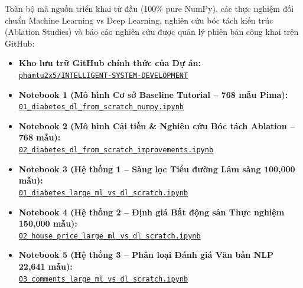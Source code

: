 \documentclass[12pt,a4paper]{report}
\begin{document}
\begin{tcolorbox}[colback=blue!3!white, colframe=blue!75!black, title=\textbf{Kho Lưu Trữ Mã Nguồn \& Hệ Thống Jupyter Notebooks Thực Nghiệm Dự Án (GitHub)}]
\small
Toàn bộ mã nguồn triển khai từ đầu (100\% pure NumPy), các thực nghiệm đối chuẩn Machine Learning vs Deep Learning, nghiên cứu bóc tách kiến trúc (Ablation Studies) và báo cáo nghiên cứu được quản lý phiên bản công khai trên GitHub:
\begin{itemize}[leftmargin=1.5em, itemsep=3pt]
    \item \textbf{Kho lưu trữ GitHub chính thức của Dự án:}\\ \href{https://github.com/phamtu2x5/INTELLIGENT-SYSTEM-DEVELOPMENT}{\texttt{phamtu2x5/INTELLIGENT-SYSTEM-DEVELOPMENT}}
    \item \textbf{Notebook 1 (Mô hình Cơ sở Baseline Tutorial -- 768 mẫu Pima):} \\\href{https://github.com/phamtu2x5/INTELLIGENT-SYSTEM-DEVELOPMENT/blob/main/src/Assigment%2003/diabetes/notebooks/01_diabetes_dl_from_scratch_numpy.ipynb}{\texttt{01\_diabetes\_dl\_from\_scratch\_numpy.ipynb}}
    \item \textbf{Notebook 2 (Mô hình Cải tiến \& Nghiên cứu Bóc tách Ablation -- 768 mẫu):} \\\href{https://github.com/phamtu2x5/INTELLIGENT-SYSTEM-DEVELOPMENT/blob/main/src/Assigment%2003/diabetes/notebooks/02_diabetes_dl_from_scratch_improvements.ipynb}{\texttt{02\_diabetes\_dl\_from\_scratch\_improvements.ipynb}}
    \item \textbf{Notebook 3 (Hệ thống 1 -- Sàng lọc Tiểu đường Lâm sàng 100,000 mẫu):} \\\href{https://github.com/phamtu2x5/INTELLIGENT-SYSTEM-DEVELOPMENT/blob/main/src/Assigment%2003/diabetes_large/notebooks/01_diabetes_large_ml_vs_dl_scratch.ipynb}{\texttt{01\_diabetes\_large\_ml\_vs\_dl\_scratch.ipynb}}
    \item \textbf{Notebook 4 (Hệ thống 2 -- Định giá Bất động sản Thực nghiệm 150,000 mẫu):} \\\href{https://github.com/phamtu2x5/INTELLIGENT-SYSTEM-DEVELOPMENT/blob/main/src/Assigment%2003/house_price_large/notebooks/02_house_price_large_ml_vs_dl_scratch.ipynb}{\texttt{02\_house\_price\_large\_ml\_vs\_dl\_scratch.ipynb}}
    \item \textbf{Notebook 5 (Hệ thống 3 -- Phân loại Đánh giá Văn bản NLP 22,641 mẫu):} \\\href{https://github.com/phamtu2x5/INTELLIGENT-SYSTEM-DEVELOPMENT/blob/main/src/Assigment%2003/customer_comments/notebooks/03_comments_large_ml_vs_dl_scratch.ipynb}{\texttt{03\_comments\_large\_ml\_vs\_dl\_scratch.ipynb}}
\end{itemize}
\end{tcolorbox}
\end{document}
